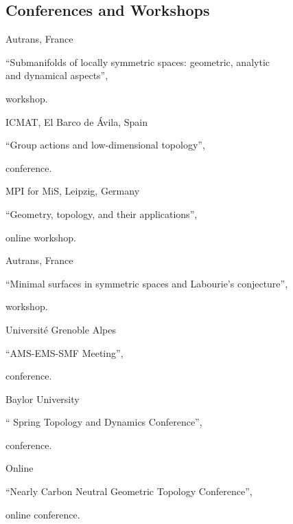 
\subsection{Conferences and Workshops}

{Autrans, France}
{``Submanifolds of locally symmetric spaces: geometric, analytic \\ and dynamical aspects'', \begin{footnotesize}
		workshop.
\end{footnotesize}}
{}


{ICMAT, El Barco de {\'A}vila, Spain}
{``Group actions and low-dimensional topology'', \begin{footnotesize}
		conference.
	\end{footnotesize}}
{}

{MPI for MiS, Leipzig, Germany}
{``Geometry, topology, and their applications'', \begin{footnotesize}
		online workshop.
\end{footnotesize}}
{}

{Autrans, France}
{``Minimal surfaces in symmetric spaces and Labourie's conjecture'', \begin{footnotesize}
		workshop.
	\end{footnotesize}}
{}

{Universit\'e Grenoble Alpes}
{``AMS-EMS-SMF Meeting'', \begin{footnotesize}
		conference.
	\end{footnotesize}}
{}

{Baylor University}
{`` Spring Topology and Dynamics Conference'', \begin{footnotesize}
		conference.
	\end{footnotesize}}
{}

{Online}
{``Nearly Carbon Neutral Geometric Topology Conference'', \begin{footnotesize}
		online conference.
	\end{footnotesize}}
{}

